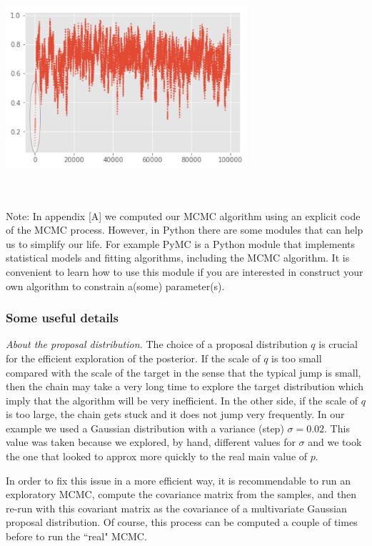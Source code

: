 \documentclass[onecolumn,           %
               showpacs,            %
               preprintnumbers,     %
               aps,                 %
               prl,          	    %
               letterpaper,             %
               superscriptaddress,      %
               nofootinbib,         %
               tightenlines,        %
               floats,floatfix      %
               ,usenatbib,
               ]{revtex4-1}
\begin{document}
\begin{minipage}{\textwidth}
\centering
\includegraphics[height=6cm]{chain1.png}
\label{chain1}
\end{minipage}\\ $ $ \\

Note: In appendix [A] we computed our MCMC algorithm using an explicit code of the MCMC process. However, in Python there are some modules that can help us to simplify our life. For example PyMC is a Python module that implements statistical models and fitting algorithms, including the MCMC algorithm. It is convenient to learn how to use this module if you are interested in construct your own algorithm to constrain a(some) parameter(s).
\subsubsection{Some useful details}

\textit{About the proposal distribution.} The choice of a proposal distribution $q$ is crucial for the efficient exploration of the posterior. If the scale of $q$ is too small compared with the scale of the target in the sense that the typical jump is small, then the chain may take a very long time to explore the target distribution which imply that the algorithm will be very inefficient. In the other side, if the scale of $q$ is too large, the chain gets stuck and it does not jump very frequently. In our example we used a Gaussian distribution with a variance (step) $\sigma=0.02$. This value was taken because we explored, by hand, different values for $\sigma$ and we took the one that looked to approx more quickly to the real main value of $p$.   

In order to fix this issue in a more efficient way, it is recommendable to run an exploratory MCMC, compute the covariance matrix from the samples, and then re-run with this covariant matrix as the covariance of a multivariate Gaussian proposal distribution. Of course, this process can be computed a couple of times before to run the ``real" MCMC.\\
\end{document}
